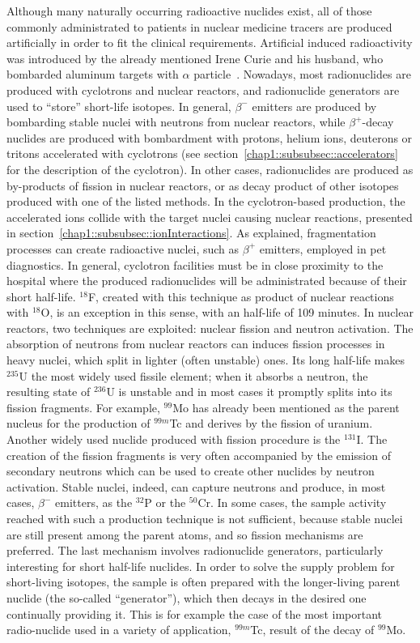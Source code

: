 Although many naturally occurring radioactive nuclides exist, all of those commonly administrated to patients in nuclear medicine tracers are produced artificially in order to fit the clinical requirements. Artificial induced radioactivity was introduced by the already mentioned Irene Curie and his husband, who bombarded aluminum targets with $\alpha$ particle~\parencite{Leone2010}. Nowadays, most radionuclides are produced with cyclotrons and nuclear reactors, and radionuclide generators are used to \enquote{store} short-life isotopes. In general, $\beta^-$ emitters are produced by bombarding stable nuclei with neutrons from nuclear reactors, while $\beta^+$-decay nuclides are produced with bombardment with protons, helium ions, deuterons or tritons accelerated with cyclotrons (see section~\ref{chap1::subsubsec::accelerators} for the description of the cyclotron). In other cases, radionuclides are produced as by-products of fission in nuclear reactors, or as decay product of other isotopes produced with one of the listed methods. 
In the cyclotron-based production, the accelerated ions collide with the target nuclei causing nuclear reactions, presented in section~\ref{chap1::subsubsec::ionInteractions}. As explained, fragmentation processes can create radioactive nuclei, such as $\beta^+$ emitters, employed in \gls{pet} diagnostics. In general, cyclotron facilities must be in close proximity to the hospital where the produced radionuclides will be administrated because of their short half-life. $^{18}$F, created with this technique as product of nuclear reactions with $^{18}$O, is an exception in this sense, with an half-life of 109 minutes. 
In nuclear reactors, two techniques are exploited: nuclear fission and neutron activation. The absorption of neutrons from nuclear reactors can induces fission processes in heavy nuclei, which split in lighter (often unstable) ones. Its long half-life makes $^{235}$U the most widely used fissile element; when it absorbs a neutron, the resulting state of $^{236}$U is unstable and in most cases it promptly splits into its fission fragments. For example, $^{99}$Mo has already been mentioned as the parent nucleus for the production of  $^{99m}$Tc and derives by the fission of uranium. Another widely used nuclide produced with fission procedure is the $^{131}$I. The creation of the fission fragments is very often accompanied by the emission of secondary neutrons which can be used to create other nuclides by neutron activation. Stable nuclei, indeed, can capture neutrons and produce, in most cases, $\beta^-$ emitters, as the $^{32}$P or the $^{50}$Cr. In some cases, the sample activity reached with such a production technique is not sufficient, because stable nuclei are still present among the parent atoms, and so fission mechanisms are preferred. 
The last mechanism involves radionuclide generators, particularly interesting for short half-life nuclides. In order to solve the supply problem for short-living isotopes, the sample is often prepared with the longer-living parent nuclide (the so-called \enquote{generator}), which then decays in the desired one continually providing it. This is for example the case of the most important radio-nuclide used in a variety of application, $^{99m}$Tc, result of the decay of $^{99}$Mo. 

